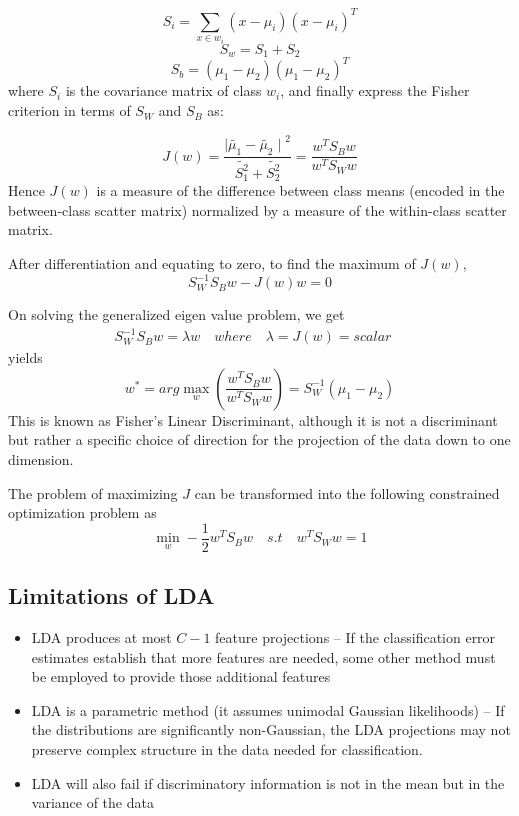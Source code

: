 \begin{equation}
S_i=\sum_{x\in w_i} \left(x-\mu_i\right){\left(x-\mu_i\right)}^T
\end{equation}
\begin{equation}
S_w=S_1+S_2
\end{equation}
\begin{equation}
S_b=\left(\mu_1-\mu_2\right){\left(\mu_1-\mu_2\right)}^T
\end{equation}
where $S_i$ is the covariance matrix of class $w_i$, and finally express the Fisher criterion in terms of $S_W$ and $S_B$ as: 

\begin{equation}
J\left(w\right)=\frac{{\mid\tilde{\mu_1}-\tilde{\mu_2}\mid}^2}{\tilde{S_1^2}+\tilde{S_2^2}}=\frac{w^T S_B w}{w^T S_W w}
\end{equation}
Hence $J(w)$ is a measure of the difference between class means (encoded in the between-class scatter matrix) normalized by a measure of the within-class scatter matrix.

 After differentiation and equating to zero, to find the maximum of $J(w)$,
\begin{equation}
S_W^{-1}S_Bw-J\left(w\right)w=0
\end{equation}

On solving the generalized eigen value problem, we get
\begin{eqnarray*}
S_W^{-1}S_Bw=\lambda w \quad where \quad\lambda=J\left(w\right)= scalar \quad  
\end{eqnarray*}
yields
\begin{equation}
w^\ast=arg\max_w \left(\frac{w^T S_B w}{w^T S_W w}\right)=S_W^{-1}\left(\mu_1-\mu_2\right)
\end{equation}
This is known as Fisher’s Linear Discriminant, although it is not a discriminant but rather a specific choice of direction for the projection of the data down to one dimension.

The problem of maximizing $J$ can be transformed into the following constrained optimization problem as
\begin{equation}
\min_w -\frac{1}{2}w^T S_B w \quad
s.t \quad w^TS_Ww=1
\end{equation}
\subsection{Limitations of LDA }
\begin{itemize}
\item LDA produces at most $C-1$ feature projections 
–   If the classification error estimates establish that more features are needed, some other method must be employed to provide those additional features 
\item LDA is a parametric method (it assumes unimodal Gaussian likelihoods) 
–  If the distributions are significantly non-Gaussian, the LDA projections may not preserve complex structure in the data needed for classification.  \item LDA will also fail if discriminatory information is not in the mean but in the variance of the data
\end{itemize}
 

